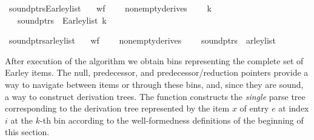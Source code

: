 \begin{isabellebody}
\isadelimproof
%
\endisadelimproof
%
\isatagproof
%
\endisatagproof
{\isafoldproof}%
%
\isadelimproof
%
\endisadelimproof
%
\begin{isamarkuptext}%
%
\end{isamarkuptext}\isamarkuptrue%
\isamarkupfalse%
\ sound{\isacharunderscore}{\kern0pt}ptrs{\isacharunderscore}{\kern0pt}Earley{\isacharunderscore}{\kern0pt}list{\isacharcolon}{\kern0pt}\isanewline
\ \ \ {\isachardoublequoteopen}wf{\isacharunderscore}{\kern0pt}{\isasymG}\ {\isasymG}{\isachardoublequoteclose}\isanewline
\ \ \ {\isachardoublequoteopen}nonempty{\isacharunderscore}{\kern0pt}derives\ {\isasymG}{\isachardoublequoteclose}\isanewline
\ \ \ {\isachardoublequoteopen}k\ {\isasymle}\ {\isacharbar}{\kern0pt}{\isasymomega}{\isacharbar}{\kern0pt}{\isachardoublequoteclose}\isanewline
\ \ \ {\isachardoublequoteopen}sound{\isacharunderscore}{\kern0pt}ptrs\ {\isasymomega}\ {\isacharparenleft}{\kern0pt}Earley{\isacharunderscore}{\kern0pt}list\ k\ {\isasymG}\ {\isasymomega}{\isacharparenright}{\kern0pt}{\isachardoublequoteclose}%
\isadelimproof
%
\endisadelimproof
%
\isatagproof
%
\endisatagproof
{\isafoldproof}%
%
\isadelimproof
%
\endisadelimproof
%
\begin{isamarkuptext}%
%
\end{isamarkuptext}\isamarkuptrue%
\isamarkupfalse%
\ sound{\isacharunderscore}{\kern0pt}ptrs{\isacharunderscore}{\kern0pt}{\isasymE}arley{\isacharunderscore}{\kern0pt}list{\isacharcolon}{\kern0pt}\isanewline
\ \ \ {\isachardoublequoteopen}wf{\isacharunderscore}{\kern0pt}{\isasymG}\ {\isasymG}{\isachardoublequoteclose}\isanewline
\ \ \ {\isachardoublequoteopen}nonempty{\isacharunderscore}{\kern0pt}derives\ {\isasymG}{\isachardoublequoteclose}\isanewline
\ \ \ {\isachardoublequoteopen}sound{\isacharunderscore}{\kern0pt}ptrs\ {\isasymomega}\ {\isacharparenleft}{\kern0pt}{\isasymE}arley{\isacharunderscore}{\kern0pt}list\ {\isasymG}\ {\isasymomega}{\isacharparenright}{\kern0pt}{\isachardoublequoteclose}%
\isadelimproof
%
\endisadelimproof
%
\isatagproof
%
\endisatagproof
{\isafoldproof}%
%
\isadelimproof
%
\endisadelimproof
%
\isadelimdocument
%
\endisadelimdocument
%
\isatagdocument
%
\isamarkuptrue%
%
\endisatagdocument
{\isafolddocument}%
%
\isadelimdocument
%
\endisadelimdocument
%
\begin{isamarkuptext}%
After execution of the  algorithm we obtain bins representing the complete set
of Earley items. The null, predecessor, and predecessor/reduction pointers provide a way to navigate
between items or through these bins, and, since they are sound, a way to construct derivation trees.
The function  constructs the \textit{single} parse tree corresponding to the
derivation tree represented by the item $x$ of entry $e$ at index $i$ at the $k$-th bin according to the
well-formedness definitions of the beginning of this section.


\end{isamarkuptext}
\end{isabellebody}
